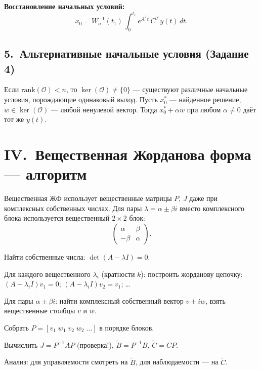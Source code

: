 \documentclass[12pt,a4paper]{article}
\begin{document}
	\textbf{Восстановление начальных условий:}
	\[
	x_0 = W_o^{-1}(t_1)\,\int_0^{t_1} e^{A^Tt}\,C^T\,y(t)\,dt.
	\]
	
	\subsection{5.~Альтернативные начальные условия (Задание 4)}
	Если $\mathrm{rank}(\mathcal{O}) < n$, то $\ker(\mathcal{O}) \neq \{0\}$ ---
	существуют различные начальные условия, порождающие одинаковый выход.
	Пусть $x_0^*$ --- найденное решение, $w \in \ker(\mathcal{O})$ --- любой ненулевой вектор.
	Тогда $x_0^* + \alpha w$ при любом $\alpha \neq 0$ даёт тот же $y(t)$.
	
	\newpage
	\section{IV.~Вещественная Жорданова форма --- алгоритм}
	
	\begin{infobox}
		Вещественная ЖФ использует вещественные матрицы $P$, $J$ даже при комплексных
		собственных числах. Для пары $\lambda = \alpha \pm \beta i$ вместо комплексного блока
		используется вещественный $2\times2$ блок:
		\[
		\begin{pmatrix} \alpha & \beta \\ -\beta & \alpha \end{pmatrix}.
		\]
	\end{infobox}
	
	\begin{algo}
		\item Найти собственные числа: $\det(A - \lambda I) = 0$.
		\item Для каждого вещественного $\lambda_i$ (кратности $k$): построить жорданову цепочку:
		$(A-\lambda_i I)v_1=0$;\; $(A-\lambda_i I)v_2=v_1$;\; \ldots
		\item Для пары $\alpha \pm \beta i$: найти комплексный собственный вектор $v+iw$,
		взять вещественные столбцы $v$ и $w$.
		\item Собрать $P = [v_1 \; w_1 \; v_2 \; w_2 \; \ldots]$ в порядке блоков.
		\item Вычислить $J = P^{-1}AP$ (проверка!), $\tilde{B} = P^{-1}B$, $\tilde{C} = CP$.
		\item Анализ: для управляемости смотреть на $\tilde{B}$, для наблюдаемости --- на $\tilde{C}$.
	\end{algo}
	
\end{document}
